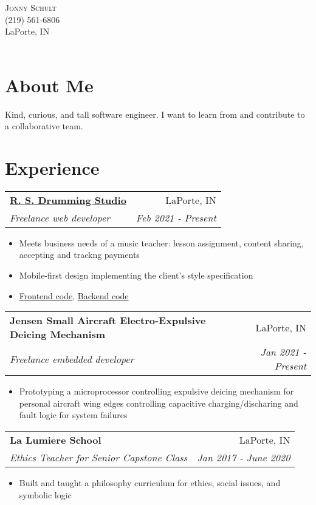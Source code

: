 \documentclass[letterpaper,11pt]{article}
\makeatletter
\newcommand{\resumeItem}[1]{
  \item\small{#1}
}
\newcommand{\resumeHeading}[4]{
    \begin{tabular*}{0.99\textwidth}[t]{l@{\extracolsep{\fill}}r}
      \textbf{#1} & #2 \\
      \textit{\small#3} & \textit{\small #4} \\
    \end{tabular*}\vspace{-5pt}
}
\newcommand{\resumeItemListStart}{\begin{itemize}}
\newcommand{\resumeItemListEnd}{\end{itemize}\vspace{-5pt}}
\makeatother
\begin{document}
\par{
    \centering
		{
            \huge \textsc{Jonny} \textsc{Schult} \\
            \normalsize (219) 561-6806 \\ LaPorte, IN \\
            \Large \color{RoyalBlue}\href{https://github.com/jonnyschult}{}
            \Large \href{mailto:jonathon.schult@gmail.com}{}
            \Large \color{RoyalBlue}\href{http://www.linkedin.com/in/jonny-schult/}{}\\
    } \bigskip \par
}

\section{About Me}
Kind, curious, and tall software engineer. I want to learn from and contribute to a collaborative team.

\section{Experience}
  \resumeHeading{\color{RoyalBlue}\href{https://www.rsdrum.com}{R. S. Drumming Studio}}{LaPorte, IN}{Freelance web developer}{Feb 2021 - Present}
      \resumeItemListStart
        \resumeItem{Meets business needs of a music teacher: lesson assignment, content sharing, accepting and trackng payments}
        \resumeItem{Mobile-first design implementing the client's style specification}
        \resumeItem{\color{RoyalBlue}\href{https://github.com/jonnyschult/rsdrumFrontend}{Frontend code}, \color{RoyalBlue}\href{https://github.com/jonnyschult/rsdrumBackend}{Backend code}}
      \resumeItemListEnd

  \resumeHeading{Jensen Small Aircraft Electro-Expulsive Deicing Mechanism}{LaPorte, IN}{Freelance embedded developer}{Jan 2021 - Present}
      \resumeItemListStart
        \resumeItem{Prototyping a microprocessor controlling expulsive deicing mechanism for personal aircraft wing edges controlling capacitive charging/discharing and fault logic for system failures}
      \resumeItemListEnd

  \resumeHeading{La Lumiere School}{LaPorte, IN}{Ethics Teacher for Senior Capstone Class}{Jan 2017 - June 2020}
      \resumeItemListStart
        \resumeItem{Built and taught a philosophy curriculum for ethics, social issues, and symbolic logic}
      \resumeItemListEnd
\end{document}
